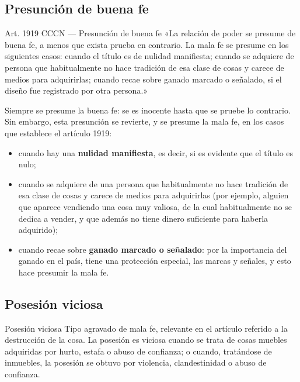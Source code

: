 \documentclass[12pt,oneside]{book}
\begin{document}
\subsection*{Presunción de buena fe}

\begin{articulo}{Art. 1919 CCCN --- Presunción de buena fe}
«La relación de poder se presume de buena fe, a menos que exista prueba en contrario. La mala fe se presume en los siguientes casos: cuando el título es de nulidad manifiesta; cuando se adquiere de persona que habitualmente no hace tradición de esa clase de cosas y carece de medios para adquirirlas; cuando recae sobre ganado marcado o señalado, si el diseño fue registrado por otra persona.»
\end{articulo}

Siempre se presume la buena fe: se es inocente hasta que se pruebe lo contrario. Sin embargo, esta presunción se revierte, y se presume la mala fe, en los casos que establece el artículo 1919:

\begin{itemize}
    \item cuando hay una \textbf{nulidad manifiesta}, es decir, si es evidente que el título es nulo;
    \item cuando se adquiere de una persona que habitualmente no hace tradición de esa clase de cosas y carece de medios para adquirirlas (por ejemplo, alguien que aparece vendiendo una cosa muy valiosa, de la cual habitualmente no se dedica a vender, y que además no tiene dinero suficiente para haberla adquirido);
    \item cuando recae sobre \textbf{ganado marcado o señalado}: por la importancia del ganado en el país, tiene una protección especial, las marcas y señales, y esto hace presumir la mala fe.
\end{itemize}

\subsection*{Posesión viciosa}

\begin{definition}{Posesión viciosa}
Tipo agravado de mala fe, relevante en el artículo referido a la destrucción de la cosa. La posesión es viciosa cuando se trata de cosas muebles adquiridas por hurto, estafa o abuso de confianza; o cuando, tratándose de inmuebles, la posesión se obtuvo por violencia, clandestinidad o abuso de confianza.
\end{definition}
\end{document}
